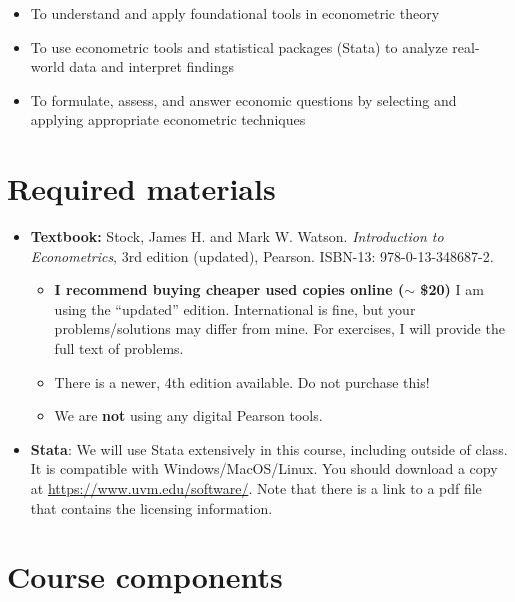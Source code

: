 \documentclass[
]{article}
\begin{document}
\begin{itemize}
\item
  To understand and apply foundational tools in econometric theory
\item
  To use econometric tools and statistical packages (Stata) to analyze
  real-world data and interpret findings
\item
  To formulate, assess, and answer economic questions by selecting and
  applying appropriate econometric techniques
\end{itemize}

\hypertarget{required-materials}{%
\section*{Required materials}\label{required-materials}}

\begin{itemize}
\item
  \textbf{Textbook:} Stock, James H. and Mark W. Watson.
  \emph{Introduction to Econometrics}, 3rd edition (updated), Pearson.
  ISBN-13: 978-0-13-348687-2.

  \begin{itemize}
  \item
    \textbf{I recommend buying cheaper used copies online (\(\sim\)
    \$20)} I am using the ``updated'' edition. International is fine,
    but your problems/solutions may differ from mine. For exercises, I
    will provide the full text of problems.
  \item
    There is a newer, 4th edition available. Do not purchase this!
  \item
    We are \textbf{not} using any digital Pearson tools.
  \end{itemize}
\item
  \textbf{Stata}: We will use Stata extensively in this course,
  including outside of class. It is compatible with Windows/MacOS/Linux.
  You should download a copy at \url{https://www.uvm.edu/software/}.
  Note that there is a link to a pdf file that contains the licensing
  information.
\end{itemize}

\hypertarget{course-components}{%
\section*{Course components}\label{course-components}}
\end{document}

